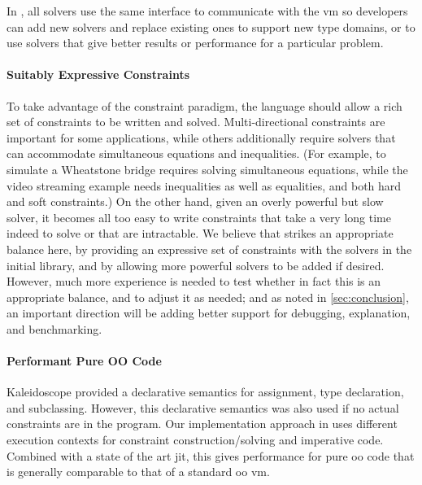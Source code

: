 In \langname, all solvers use the same interface to communicate with
the \ac{vm} so developers can add new solvers and replace existing
ones to support new type domains, or to use solvers that give better
results or performance for a particular problem.

\paragraph{Suitably Expressive Constraints}
To take advantage of the constraint paradigm, the language should
allow a rich set of constraints to be written and solved.
Multi-directional constraints are important for some applications,
while others additionally require solvers that can accommodate
simultaneous equations and inequalities.  (For example, to simulate a
Wheatstone bridge requires solving simultaneous equations, while the
video streaming example needs inequalities as well as equalities, and
both hard and soft constraints.)  On the other hand, given an overly
powerful but slow solver, it becomes all too easy to write constraints
that take a very long time indeed to solve or that are intractable.
We believe that \langname strikes an appropriate balance here, by
providing an expressive set of constraints with the solvers in the
initial library, and by allowing more powerful solvers to be added if
desired.  However, much more experience is needed to test whether in
fact this is an appropriate balance, and to adjust it as needed; and
as noted in \autoref{sec:conclusion}, an important
direction will be adding better support for debugging, explanation,
and benchmarking.

\paragraph{Performant Pure OO Code}
Kaleidoscope provided a declarative semantics for assignment, type
declaration, and subclassing. However, this declarative semantics was
also used if no actual constraints are in the program. Our
implementation approach in \toolname uses different execution contexts
for constraint construction/solving and imperative code. Combined with
a state of the art \ac{jit}, this gives performance for pure \ac{oo}
code that is generally comparable to that of a standard \ac{oo} \ac{vm}.

